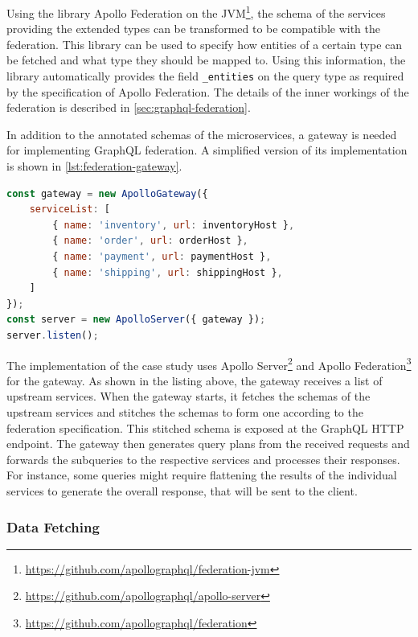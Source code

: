 Using the library Apollo Federation on the \ac{JVM}\footnote{\url{https://github.com/apollographql/federation-jvm}}, the schema of the services providing the extended types can be transformed to be compatible with the federation.
This library can be used to specify how entities of a certain type can be fetched and what type they should be mapped to.
Using this information, the library automatically provides the field \texttt{\_entities} on the query type as required by the specification of Apollo Federation.
The details of the inner workings of the federation is described in \autoref{sec:graphql-federation}.

In addition to the annotated schemas of the microservices, a gateway is needed for implementing GraphQL federation.
A simplified version of its implementation is shown in \autoref{lst:federation-gateway}. 

\begin{lstlisting}[caption={Implementation of the GraphQL Gateway}, language=javascript, label={lst:federation-gateway}]
const gateway = new ApolloGateway({
    serviceList: [
        { name: 'inventory', url: inventoryHost },
        { name: 'order', url: orderHost },
        { name: 'payment', url: paymentHost },
        { name: 'shipping', url: shippingHost },
    ]
});
const server = new ApolloServer({ gateway });
server.listen();
\end{lstlisting}

The implementation of the case study uses Apollo Server\footnote{\url{https://github.com/apollographql/apollo-server}} and Apollo Federation\footnote{\url{https://github.com/apollographql/federation}} for the gateway.
As shown in the listing above, the gateway receives a list of upstream services.
When the gateway starts, it fetches the schemas of the upstream services and stitches the schemas to form one according to the federation specification.
This stitched schema is exposed at the GraphQL \ac{HTTP} endpoint.
The gateway then generates query plans from the received requests and forwards the subqueries to the respective services and processes their responses.
For instance, some queries might require flattening the results of the individual services to generate the overall response, that will be sent to the client.

\subsubsection{Data Fetching}\label{sec:graphql-data-fetching}

